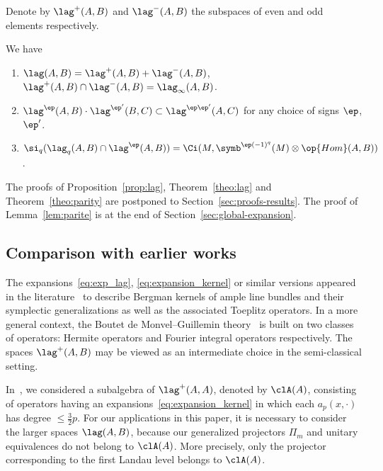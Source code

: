 Denote by $\lag^+ (A, B)$ and $\lag^- (A, B)$ the subspaces of even and odd elements respectively.

\begin{theo}\label{theo:parity}
We have
\begin{enumerate}
\item\label{theo2.7.1} $ \lag (A, B) = \lag^+ (A, B) + \lag^- (A, B)$, $\lag^+ (A,B)
\cap \lag ^{-} (A,B) = \lag_{\infty} (A,B)$.
\item\label{theo2.7.2} $\lag ^{\ep} (A,B) \cdot \lag^{\ep'} (B,C) \subset \lag ^{\ep \ep'} (A, C) $ for any choice of signs $\ep$, $\ep'$.
\item\label{theo2.7.3} $\si_q(\lag_q(A,B) \cap \lag^{\ep} (A,B)) = \Ci (M,
\symb^{\ep (-1)^q}(M) \otimes \op{Hom} (A,B))$.
\end{enumerate}
\end{theo}


The proofs of Proposition~\ref{prop:lag}, Theorem~\ref{theo:lag} and Theorem~\ref{theo:parity} are postponed to Section~\ref{sec:proofs-results}. The proof of Lemma~\ref{lem:parite} is at the end of Section~\ref{sec:global-expansion}.


\subsection{Comparison with earlier works}

The expansions~\eqref{eq:exp_lag}, \eqref{eq:expansion_kernel} or similar versions appeared in the literature~\cite{MaMa,oim_op,ShZe} to describe Bergman kernels of ample line bundles and their symplectic generalizations as well as the associated Toeplitz operators. In a more general context, the Boutet de Monvel--Guillemin theory~\cite{BoGu} is built on two classes of operators: Hermite operators and Fourier integral operators respectively. The spaces $\lag^{+} (A,B)$ may be viewed as an intermediate choice in the semi-classical setting.


In~\cite{oim}, we considered a subalgebra of $\lag^{+} (A,A)$, denoted by $\clA(A)$, consisting of operators having an expansions~\eqref{eq:expansion_kernel} in which each $a_p(x,\cdot)$ has degree $\leqslant \frac{3}{2} p$. For our applications in this paper, it is necessary to consider the larger spaces $\lag (A,B)$, because our generalized projectors $\Pi_m$ and unitary equivalences do not belong to $\clA (A)$. More precisely, only the projector corresponding to the first Landau level belongs to $\clA (A)$.

